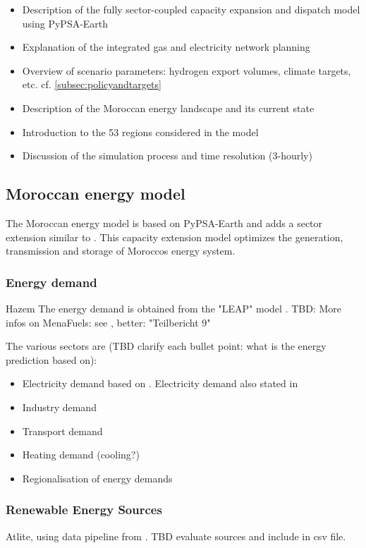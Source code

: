 \begin{itemize}
    \item Description of the fully sector-coupled capacity expansion and dispatch model using PyPSA-Earth
    \item Explanation of the integrated gas and electricity network planning
    \item Overview of scenario parameters: hydrogen export volumes, climate targets, etc. cf. \ref{subsec:policyandtargets}
    \item Description of the Moroccan energy landscape and its current state
    \item Introduction to the 53 regions considered in the model
    \item Discussion of the simulation process and time resolution (3-hourly)
\end{itemize}

\subsection{Moroccan energy model}
\label{subsec:moroccan_model}
The Moroccan energy model is based on PyPSA-Earth \cite{Parzen2022} and adds a sector extension similar to \cite{Brown2018a}.
This capacity extension model optimizes the generation, transmission and storage of Moroccos energy system.


\subsubsection{Energy demand}
Hazem
The energy demand is obtained from the "LEAP" model \cite{Heaps2022}.
TBD: More infos on MenaFuels: see \cite[p. 35]{Ersoy2022}, better: "Teilbericht 9"

The various sectors are (TBD clarify each bullet point: what is the energy prediction based on):
\begin{itemize}
    \item Electricity demand based on \cite{Parzen2022}. Electricity demand also stated in \cite[primary source 25]{Boulakhbar2020}
    \item Industry demand
    \item Transport demand
    \item Heating demand (cooling?) 
    \item Regionalisation of energy demands
\end{itemize}



\subsubsection{Renewable Energy Sources}
Atlite, using data pipeline from \cite{Parzen2022}. TBD evaluate sources and include in csv file.


